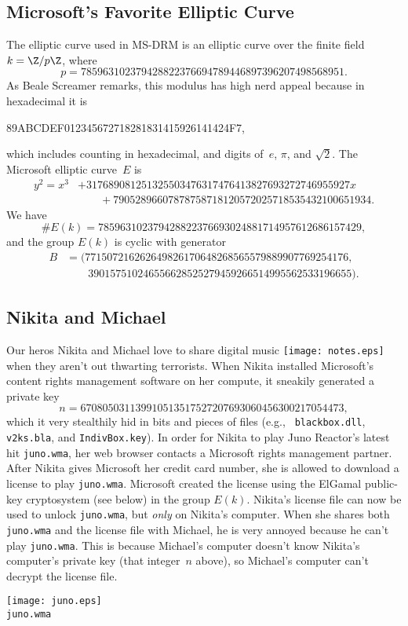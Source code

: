 \documentclass[11pt]{report}
\begin{document}
\subsection{Microsoft's Favorite Elliptic Curve}
\noindent{}The elliptic curve used in MS-DRM is an elliptic curve over the finite
field $k=\Z/p\Z$, where
$$
  p=785963102379428822376694789446897396207498568951.
$$
As Beale Screamer remarks, this modulus has high nerd appeal because in
hexadecimal it is
\begin{center}
  89ABCDEF012345672718281831415926141424F7,
\end{center}
which
includes counting in hexadecimal, and digits of~$e$,
$\pi$, and $\sqrt{2}$.
The Microsoft elliptic curve~$E$ is
\begin{align*}
  y^2 = x^3 & + 317689081251325503476317476413827693272746955927x      \\
            & \qquad +79052896607878758718120572025718535432100651934.
\end{align*}
We have
$$\# E(k) = 785963102379428822376693024881714957612686157429,$$
and the group $E(k)$ is cyclic with generator
\begin{align*}
  B & = (771507216262649826170648268565579889907769254176,      \\
    & \qquad 390157510246556628525279459266514995562533196655).
\end{align*}
\subsection{Nikita and Michael}
\vspace{-4ex}Our heros Nikita and Michael love to share digital music
\texttt{[image: notes.eps]}
when they aren't out thwarting terrorists.
When Nikita installed Microsoft's
content rights management software on
her compute, it sneakily generated a private key
$$
  n = 670805031139910513517527207693060456300217054473,
$$
which it very stealthily hid in bits and pieces of files (e.g., {\tt
    blackbox.dll}, {\tt v2ks.bla}, and {\tt IndivBox.key}).  In order for
Nikita to play Juno Reactor's latest hit {\tt juno.wma}, her web
browser contacts a Microsoft rights management partner.  After Nikita
gives Microsoft her credit card number, she is allowed to download a
license to play {\tt juno.wma}.  Microsoft created the license using
the ElGamal public-key cryptosystem (see below) in the group $E(k)$.
Nikita's license file can now be used to unlock {\tt juno.wma}, but
  {\em only} on Nikita's computer.  When she shares both {\tt juno.wma}
and the license file with Michael, he is very annoyed because he can't
play {\tt juno.wma}. This is because Michael's computer doesn't know
Nikita's computer's private key (that integer~$n$ above),
so Michael's computer can't decrypt the license file.
\begin{center}
  \texttt{[image: juno.eps]}\\
  {\tt juno.wma}
\end{center}
\end{document}
